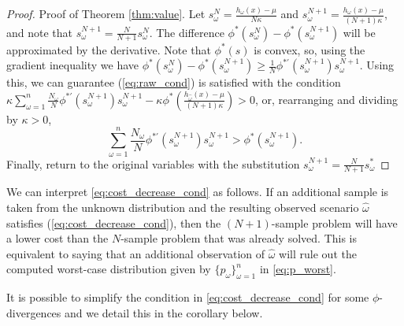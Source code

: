 \documentclass[opre,nonblindrev]{informs3} %
\begin{document}
\begin{proof}{\sc Proof of Theorem \ref{thm:value}.}
	Let $s^N_\omega = \frac{h_\omega(x) - \mu}{N\kappa}$ and $s^{N+1}_\omega = \frac{h_\omega(x) - \mu}{(N+1)\kappa}$, and note that $s^{N+1}_\omega = \tfrac{N}{N+1} s^N_\omega$.
	The difference $\phi^*(s^N_\omega) - \phi^*(s^{N+1}_\omega)$ will be approximated by the derivative.
Note that $\phi^*(s)$ is convex, so, using the gradient inequality we have $\phi^*(s^N_\omega) - \phi^*(s^{N+1}_\omega) \geq \frac{1}{N} \phi^{*\prime}(s^{N+1}_\omega) s^{N+1}_\omega$. 
	Using this, we can guarantee (\ref{eq:raw_cond}) is satisfied with the condition $\kappa \sum_{\omega=1}^n \frac{N_\omega}{N} \phi^{*\prime}(s^{N+1}_\omega) s^{N+1}_\omega - \kappa \phi^*\left(\frac{h_{\hat{\omega}}(x) - \mu}{(N+1)\kappa}\right) > 0$, or, rearranging and dividing by $\kappa > 0$,
	\begin{equation} \label{eq:main_value_derivation}
		\sum_{\omega=1}^n \frac{N_\omega}{N} \phi^{*\prime}(s^{N+1}_\omega) s^{N+1}_\omega > \phi^*(s^{N+1}_\omega).
	\end{equation}
	Finally, return to the original variables with the substitution $s^{N+1}_\omega = \frac{N}{N+1} s^*_\omega$
	\Halmos
\end{proof}

We can interpret \eqref{eq:cost_decrease_cond} as follows. If an additional sample is taken from the unknown distribution and the resulting observed scenario $\hat{\omega}$ satisfies (\ref{eq:cost_decrease_cond}), then the $(N+1)$-sample problem will have a lower cost than the $N$-sample problem that was already solved.
This is equivalent to saying that an additional observation of $\hat{\omega}$ will rule out the computed worst-case distribution given by $\{p_\omega\}_{\omega=1}^{n}$ in \eqref{eq:p_worst}.

It is possible to simplify the condition in \eqref{eq:cost_decrease_cond} for some $\phi$-divergences and we detail this in the corollary below. 
\end{document}
